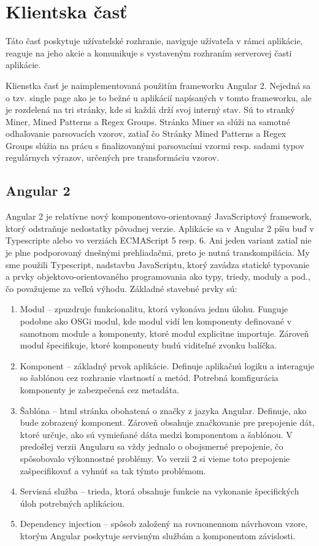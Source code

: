 \chapter{Klientska časť}
Táto časť poskytuje užívateľské rozhranie, naviguje užívateľa v rámci aplikácie, reaguje na jeho akcie a komunikuje s vystaveným rozhraním serverovej časti aplikácie.
\par Klienstka časť je naimplementovaná použitím frameworku Angular 2. Nejedná sa o tzv. single page ako je to bežné u aplikácií napísaných v tomto frameworku, ale je rozdelená na tri stránky, kde si každá drží svoj interný stav. Sú to stranký Miner, Mined Patterns a Regex Groups. Stránka Miner sa slúži na samotné odhaľovanie parsovacích vzorov, zatiaľ čo Stránky Mined Patterns a Regex Groups slúžia na prácu s finalizovanými parsovacími vzormi resp. sadami typov regulárnych výrazov, určených pre transformáciu vzorov.


\section{Angular 2}
Angular 2 je relatívne nový komponentovo-orientovaný JavaScriptový framework, ktorý odstraňuje nedostatky pôvodnej verzie. Aplikácie sa v Angular 2 píšu buď v Typescripte alebo vo verziách ECMAScript 5 resp. 6. Ani jeden variant zatiaľ nie je plne podporovaný dnešnými prehliadačmi, preto je nutná transkompilácia. My sme použili Typescript, nadstavbu JavaScriptu, ktorý zavádza statické typovanie a prvky objektovo-orientovaného programovania ako typy, triedy, moduly a pod., čo považujeme za veľkú výhodu. Základné stavebné prvky sú:

\begin{enumerate}
 \item Modul -- zpuzdruje funkcionalitu, ktorá vykonáva jednu úlohu. Funguje podobne ako OSGi modul, kde modul vidí len komponenty definované v samotnom module a komponenty, ktoré modul explicitne importuje. Zároveň modul špecifikuje, ktoré komponenty budú viditeľné zvonku balíčka.
 \item Komponent -- základný prvok aplikácie. Definuje aplikačnú logiku a interaguje so šablónou cez rozhranie vlastností a metód. Potrebná komfigurácia komponenty je zabezpečená cez metadáta.
 \item Šablóna -- html stránka obohatená o značky z jazyka Angular. Definuje, ako bude zobrazený komponent. Zároveň obsahuje značkovanie pre prepojenie dát, ktoré určuje, ako sú vymieňané dáta medzi komponentom a šablónou. V predošlej verzii Angularu sa vždy jednalo o obojsmerné prepojenie, čo spôsobovalo výkonnostné problémy. Vo verzii 2 si vieme toto prepojenie zašpecifikovať a vyhnúť sa tak týmto problémom.
 \item Servisná služba -- trieda, ktorá obsahuje funkcie na vykonanie špecifických úloh potrebných aplikáciou.
 \item Dependency injection -- spôsob založený na rovnomennom návrhovom vzore, ktorým Angular poskytuje servisným službám a komponentom závislosti.
\end{enumerate}


